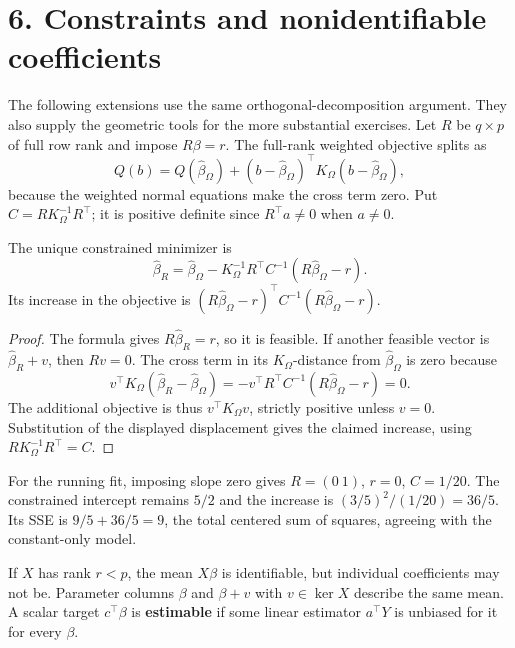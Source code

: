 \section*{6. Constraints and nonidentifiable coefficients}
The following extensions use the same orthogonal-decomposition argument.
They also supply the geometric tools for the more substantial exercises.
Let $R$ be $q\times p$ of full row rank and impose $R\beta=r$.
The full-rank weighted objective splits as
\[
Q(b)=Q(\widehat\beta_\Omega)
+(b-\widehat\beta_\Omega)^\top K_\Omega(b-\widehat\beta_\Omega),
\]
because the weighted normal equations make the cross term zero.
Put $C=RK_\Omega^{-1}R^\top$; it is positive definite since
$R^\top a\ne0$ when $a\ne0$.

\begin{proposition}\label{prop:11:constraint}
The unique constrained minimizer is
\[
\widehat\beta_R=\widehat\beta_\Omega
-K_\Omega^{-1}R^\top C^{-1}(R\widehat\beta_\Omega-r).
\]
Its increase in the objective is
$(R\widehat\beta_\Omega-r)^\top C^{-1}(R\widehat\beta_\Omega-r)$.
\end{proposition}
\begin{proof}
The formula gives $R\widehat\beta_R=r$, so it is feasible.
If another feasible vector is $\widehat\beta_R+v$, then $Rv=0$.
The cross term in its $K_\Omega$-distance from $\widehat\beta_\Omega$
is zero because
\[
v^\top K_\Omega(\widehat\beta_R-\widehat\beta_\Omega)
=-v^\top R^\top C^{-1}(R\widehat\beta_\Omega-r)=0.
\]
The additional objective is thus $v^\top K_\Omega v$, strictly positive
unless $v=0$. Substitution of the displayed displacement gives the
claimed increase, using $RK_\Omega^{-1}R^\top=C$.
\end{proof}

For the running fit, imposing slope zero gives $R=(0\ 1)$, $r=0$,
$C=1/20$. The constrained intercept remains $5/2$ and the increase
is $(3/5)^2/(1/20)=36/5$. Its SSE is $9/5+36/5=9$, the total centered
sum of squares, agreeing with the constant-only model.

If $X$ has rank $r<p$, the mean $X\beta$ is identifiable, but individual
coefficients may not be. Parameter columns $\beta$ and $\beta+v$ with
$v\in\ker X$ describe the same mean. A scalar target $c^\top\beta$ is
\textbf{estimable} if some linear estimator $a^\top Y$ is unbiased for
it for every $\beta$.

